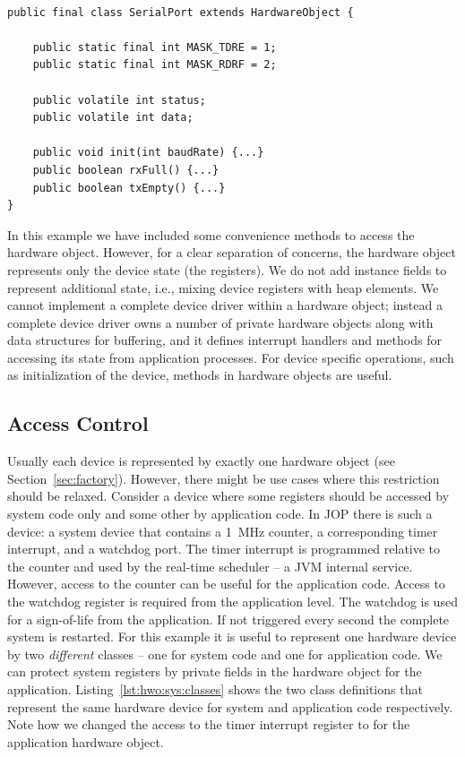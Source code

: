 \begin{lstlisting}[float,caption={A serial port class with device methods},
label=lst:hwo:serial]

public final class SerialPort extends HardwareObject {

    public static final int MASK_TDRE = 1;
    public static final int MASK_RDRF = 2;

    public volatile int status;
    public volatile int data;

    public void init(int baudRate) {...}
    public boolean rxFull() {...}
    public boolean txEmpty() {...}
}
\end{lstlisting}

In this example we have included some convenience methods to access
the hardware object. However, for a clear separation of concerns, the
hardware object represents only the device state (the registers). We
do not add instance fields to represent additional state, i.e.,
mixing device registers with heap elements. We cannot implement a
complete device driver within a hardware object; instead a complete
device driver owns a number of private hardware objects along with
data structures for buffering, and it defines interrupt handlers and
methods for accessing its state from application processes. For
device specific operations, such as initialization of the device,
methods in hardware objects are useful.

\subsection{Access Control}

Usually each device is represented by exactly one hardware object
(see Section~\ref{sec:factory}). However, there might be use cases
where this restriction should be relaxed. Consider a device where
some registers should be accessed by system code only and some other
by application code. In JOP there is such a device: a system device
that contains a 1~MHz counter, a corresponding timer interrupt, and a
watchdog port. The timer interrupt is programmed relative to the
counter and used by the real-time scheduler -- a JVM internal
service. However, access to the counter can be useful for the
application code. Access to the watchdog register is required from
the application level. The watchdog is used for a sign-of-life from
the application. If not triggered every second the complete system is
restarted. For this example it is useful to represent one hardware
device by two \emph{different} classes -- one for system code and one
for application code. We can protect system registers by private
fields in the hardware object for the application.
Listing~\ref{lst:hwo:sys:classes} shows the two class definitions
that represent the same hardware device for system and application
code respectively. Note how we changed the access to the timer
interrupt register to  for the application hardware
object.

